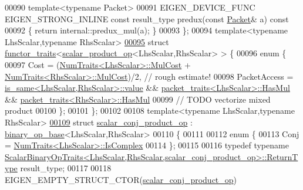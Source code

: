 \begin{DoxyCode}
00090   \textcolor{keyword}{template}<\textcolor{keyword}{typename} Packet>
00091   EIGEN\_DEVICE\_FUNC EIGEN\_STRONG\_INLINE \textcolor{keyword}{const} result\_type predux(\textcolor{keyword}{const} \hyperlink{union_eigen_1_1internal_1_1_packet}{Packet}& a)\textcolor{keyword}{ const}
00092 \textcolor{keyword}{  }\{ \textcolor{keywordflow}{return} internal::predux\_mul(a); \}
00093 \};
00094 \textcolor{keyword}{template}<\textcolor{keyword}{typename} LhsScalar,\textcolor{keyword}{typename} RhsScalar>
\hyperlink{struct_eigen_1_1internal_1_1functor__traits_3_01scalar__product__op_3_01_lhs_scalar_00_01_rhs_scalar_01_4_01_4}{00095} \textcolor{keyword}{struct }\hyperlink{struct_eigen_1_1internal_1_1functor__traits}{functor\_traits}<\hyperlink{struct_eigen_1_1internal_1_1scalar__product__op}{scalar\_product\_op}<LhsScalar,RhsScalar> > \{
00096   \textcolor{keyword}{enum} \{
00097     Cost = (\hyperlink{group___core___module_struct_eigen_1_1_num_traits}{NumTraits<LhsScalar>::MulCost} + 
      \hyperlink{group___core___module_struct_eigen_1_1_num_traits}{NumTraits<RhsScalar>::MulCost})/2, \textcolor{comment}{// rough estimate!}
00098     PacketAccess = \hyperlink{struct_eigen_1_1internal_1_1is__same}{is\_same<LhsScalar,RhsScalar>::value} && 
      \hyperlink{struct_eigen_1_1internal_1_1packet__traits}{packet\_traits<LhsScalar>::HasMul} && 
      \hyperlink{struct_eigen_1_1internal_1_1packet__traits}{packet\_traits<RhsScalar>::HasMul}
00099     \textcolor{comment}{// TODO vectorize mixed product}
00100   \};
00101 \};
00102 
00108 \textcolor{keyword}{template}<\textcolor{keyword}{typename} LhsScalar,\textcolor{keyword}{typename} RhsScalar>
\hyperlink{struct_eigen_1_1internal_1_1scalar__conj__product__op}{00109} \textcolor{keyword}{struct }\hyperlink{struct_eigen_1_1internal_1_1scalar__conj__product__op}{scalar\_conj\_product\_op}  : \hyperlink{struct_eigen_1_1internal_1_1binary__op__base}{binary\_op\_base}<LhsScalar,RhsScalar>
00110 \{
00111 
00112   \textcolor{keyword}{enum} \{
00113     Conj = \hyperlink{group___core___module_struct_eigen_1_1_num_traits}{NumTraits<LhsScalar>::IsComplex}
00114   \};
00115   
00116   \textcolor{keyword}{typedef} \textcolor{keyword}{typename} 
      \hyperlink{group___core___module_struct_eigen_1_1_scalar_binary_op_traits}{ScalarBinaryOpTraits<LhsScalar,RhsScalar,scalar\_conj\_product\_op>::ReturnType}
       result\_type;
00117   
00118   EIGEN\_EMPTY\_STRUCT\_CTOR(\hyperlink{struct_eigen_1_1internal_1_1scalar__conj__product__op}{scalar\_conj\_product\_op})

\end{DoxyCode}
